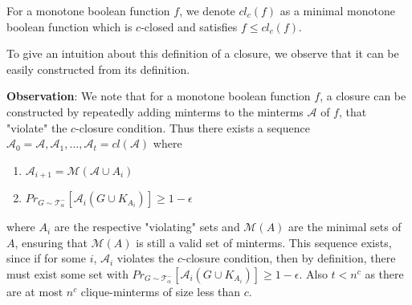 \begin{definition}
    For a monotone boolean function $f$, we denote $cl_c(f)$ as a minimal monotone boolean function which is $c$-closed and satisfies $f \leq cl_c(f)$.
\end{definition}

To give an intuition about this definition of a closure, we observe that it can be easily constructed from its definition.


\textbf{Observation}: We note that for a monotone boolean function $f$, a closure can be constructed by repeatedly adding minterms to the minterms $\mathcal{A}$ of $f$, that "violate" the $c$-closure condition. Thus there exists a sequence $\mathcal{A}_0 = \mathcal{A}, \mathcal{A}_1, \dots, \mathcal{A}_t = cl(\mathcal{A})$ where
    \begin{enumerate}
        \item $\mathcal{A}_{i + 1} = \mathcal{M}(\mathcal{A} \cup A_i)$
        \item $Pr_{G \sim \mathcal{T}^-_\alpha}[\mathcal{A}_i(G \cup K_{A_i})] \geq 1-\epsilon$
    \end{enumerate}
where $A_i$ are the respective "violating" sets and $\mathcal{M}(A)$ are the minimal sets of $A$, ensuring that $\mathcal{M}(A)$ is still a valid set of minterms. This sequence exists, since if for some $i$, $\mathcal{A}_i$ violates the $c$-closure condition, then by definition, there must exist some set with $Pr_{G \sim \mathcal{T}^-_\alpha}[\mathcal{A}_i(G \cup K_{A_i})] \geq 1-\epsilon$. Also $t < n^c$ as there are at most $n^c$ clique-minterms of size less than $c$. 


